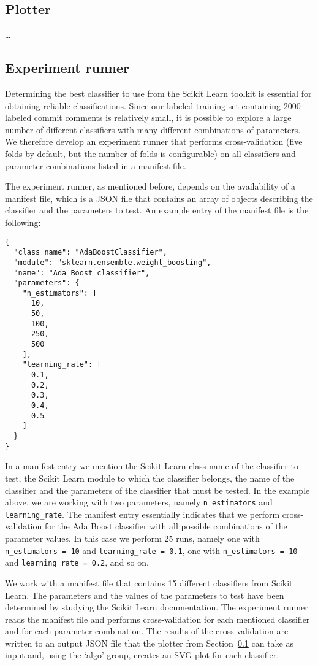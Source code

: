 \documentclass{article}
\begin{document}
\subsection{Plotter}\label{sec:plotter}
\ldots

\subsection{Experiment runner}\label{sec:experiment-runner}
Determining the best classifier to use from the Scikit Learn toolkit is
essential for obtaining reliable classifications. Since our labeled training
set containing 2000 labeled commit comments is relatively small, it is possible
to explore a large number of different classifiers with many different
combinations of parameters. We therefore develop an experiment runner that
performs cross-validation (five folds by default, but the number of folds is
configurable) on all classifiers and parameter combinations listed in a
manifest file.

The experiment runner, as mentioned before, depends on the availability of
a manifest file, which is a JSON file that contains an array of objects
describing the classifier and the parameters to test. An example entry
of the manifest file is the following:

\begin{verbatim}
{
  "class_name": "AdaBoostClassifier",
  "module": "sklearn.ensemble.weight_boosting",
  "name": "Ada Boost classifier",
  "parameters": {
    "n_estimators": [
      10,
      50,
      100,
      250,
      500
    ],
    "learning_rate": [
      0.1,
      0.2,
      0.3,
      0.4,
      0.5
    ]
  }
}
\end{verbatim}

In a manifest entry we mention the Scikit Learn class name of the classifier
to test, the Scikit Learn module to which the classifier belongs, the name
of the classifier and the parameters of the classifier that must be tested.
In the example above, we are working with two parameters, namely
{\tt n\_estimators} and {\tt learning\_rate}. The manifest entry essentially
indicates that we perform cross-validation for the Ada Boost classifier with
all possible combinations of the parameter values. In this case we perform
25 runs, namely one with {\tt n\_estimators = 10} and {\tt learning\_rate =
0.1}, one with {\tt n\_estimators = 10} and {\tt learning\_rate = 0.2}, and
so on.

We work with a manifest file that contains 15 different classifiers from
Scikit Learn. The parameters and the values of the parameters to test have
been determined by studying the Scikit Learn documentation. The experiment
runner reads the manifest file and performs cross-validation for each
mentioned classifier and for each parameter combination. The results of the
cross-validation are written to an output JSON file that the plotter from
Section~\ref{sec:plotter} can take as input and, using the `algo' group,
creates an SVG plot for each classifier.
\end{document}
